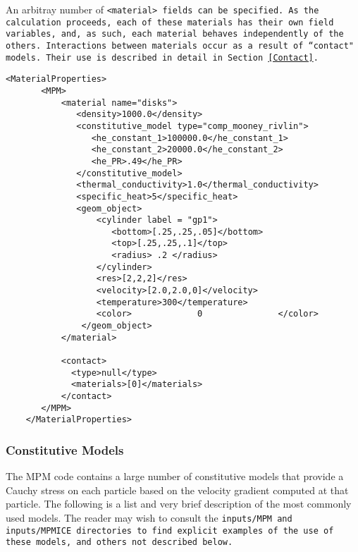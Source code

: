 An arbitray number of \tt <material> \normalfont fields can be specified.
As the calculation proceeds, each of these materials has their own field
variables, and, as such, each material behaves independently of the others.
Interactions between materials occur as a result of ``contact" models.
Their use is described in detail in Section~\ref{Contact}.

\begin{Verbatim}[fontsize=\footnotesize]
    <MaterialProperties>
       <MPM>
           <material name="disks">
              <density>1000.0</density>
              <constitutive_model type="comp_mooney_rivlin">
                 <he_constant_1>100000.0</he_constant_1>
                 <he_constant_2>20000.0</he_constant_2>
                 <he_PR>.49</he_PR>
              </constitutive_model>
              <thermal_conductivity>1.0</thermal_conductivity>
              <specific_heat>5</specific_heat>
              <geom_object>
                  <cylinder label = "gp1">
                     <bottom>[.25,.25,.05]</bottom>
                     <top>[.25,.25,.1]</top>
                     <radius> .2 </radius>
                  </cylinder>
                  <res>[2,2,2]</res>
                  <velocity>[2.0,2.0,0]</velocity>
                  <temperature>300</temperature>
                  <color>             0               </color>
               </geom_object>
           </material>

           <contact>
             <type>null</type>
             <materials>[0]</materials>
           </contact>
       </MPM>
    </MaterialProperties>
\end{Verbatim}

\subsubsection{Constitutive Models} \label{ConstitutiveModels}

The MPM code contains a large number of constitutive models that provide
a Cauchy stress on each particle based on the velocity gradient computed at
that particle.  The following is a list and very brief description of 
the most commonly used models.  The reader may wish to consult the
\tt inputs/MPM \normalfont and \tt inputs/MPMICE \normalfont directories
to find explicit examples of the use of these models, and others not
described below.

